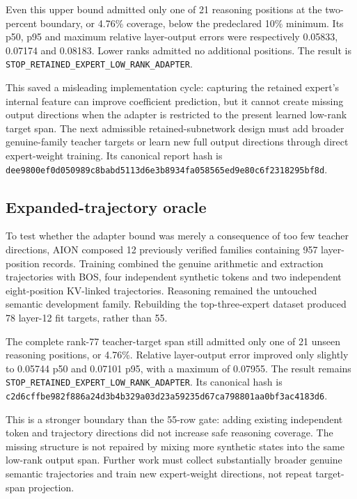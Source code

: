 Even this upper bound admitted only one of 21 reasoning positions at the
two-percent boundary, or 4.76\% coverage, below the predeclared 10\% minimum.
Its p50, p95 and maximum relative layer-output errors were respectively
0.05833, 0.07174 and 0.08183.  Lower ranks admitted no additional positions.
The result is \texttt{STOP\_RETAINED\_EXPERT\_LOW\_RANK\_ADAPTER}.

This saved a misleading implementation cycle: capturing the retained expert's
internal feature can improve coefficient prediction, but it cannot create
missing output directions when the adapter is restricted to the present
learned low-rank target span.  The next admissible retained-subnetwork design
must add broader genuine-family teacher targets or learn new full output
directions through direct expert-weight training.  Its canonical report hash
is
\texttt{dee9800ef0d050989c8babd5113d6e3b8934fa058565ed9e80c6f2318295bf8d}.

\subsection{Expanded-trajectory oracle}

To test whether the adapter bound was merely a consequence of too few teacher
directions, AION composed 12 previously verified families containing 957
layer-position records.  Training combined the genuine arithmetic and
extraction trajectories with BOS, four independent synthetic tokens and two
independent eight-position KV-linked trajectories.  Reasoning remained the
untouched semantic development family.  Rebuilding the top-three-expert
dataset produced 78 layer-12 fit targets, rather than 55.

The complete rank-77 teacher-target span still admitted only one of 21 unseen
reasoning positions, or 4.76\%.  Relative layer-output error improved only
slightly to 0.05744 p50 and 0.07101 p95, with a maximum of 0.07955.  The result
remains \texttt{STOP\_RETAINED\_EXPERT\_LOW\_RANK\_ADAPTER}.  Its canonical
hash is
\texttt{c2d6cffbe982f886a24d3b4b329a03d23a59235d67ca798801aa0bf3ac4183d6}.

This is a stronger boundary than the 55-row gate: adding existing independent
token and trajectory directions did not increase safe reasoning coverage.
The missing structure is not repaired by mixing more synthetic states into the
same low-rank output span.  Further work must collect substantially broader
genuine semantic trajectories and train new expert-weight directions, not
repeat target-span projection.

